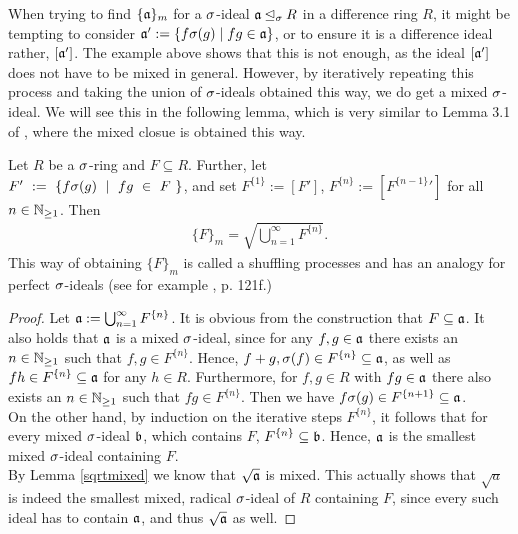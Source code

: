 When trying to find $\{\mathfrak{a}\}_m$ for a $\sigma$-ideal $\mathfrak{a} \unlhd_{\sigma} R$ in a difference ring $R$, it might be tempting to consider $\mathfrak{a}':= \{ f\sigma(g) \mid fg \in \mathfrak{a} \}$, or to ensure it is a difference ideal rather, $[\mathfrak{a}']$. The example above shows that this is not enough,
as the ideal $[\mathfrak{a}']$ does not have to be mixed in general. However, by iteratively repeating this process and taking the union of $\sigma$-ideals obtained this way, we do get a mixed $\sigma$-ideal. We will see this in the following lemma, 
which is very similar to Lemma 3.1 of \cite{levinmixed}, where the mixed closue is obtained this way.
\begin{lem}\label{lemshuffling}
Let $R$ be a $\sigma$-ring and $F \subseteq R$. Further, let \\ $F'~:=~\{f\sigma(g)~\mid~fg~\in~F~\}$, and set $F^{\{1\}}:= [F']$, $F^{\{n\}}:= [{F^{\{n-1\}}}']$ for all $n \in \mathbb{N}_{\geq1}$. Then
\begin{align} \{F\}_m = \sqrt{\bigcup_{n=1}^{\infty} F^{\{n\}}}. \end{align}
This way of obtaining $\{F\}_m$ is called a shuffling processes and has an analogy for perfect $\sigma$-ideals (see for example \cite{levin}, p. 121f.) 
\begin{proof}
Let $\mathfrak{a}:= \bigcup_{n=1}^{\infty} F^{\{n\}}$. It is obvious from the construction that $F \subseteq \mathfrak{a}$. It also holds that $\mathfrak{a}$ is a mixed $\sigma$-ideal, since for any $f,g \in \mathfrak{a}$ there exists an $n \in \mathbb{N}_{\geq1}$ such that $f,g \in F^{\{n\}}$.
Hence, $f + g, \sigma(f) \in F^{\{n\}} \subseteq \mathfrak{a}$, as well as $fh \in F^{\{n\}} \subseteq \mathfrak{a}$ for any $h \in R$. Furthermore, for $f, g \in R$ with $fg \in \mathfrak{a}$ there also exists an $n \in \mathbb{N}_{\geq1}$ such that $fg \in F^{\{n\}}$. 
Then we have $f\sigma(g) \in F^{\{n+1\}} \subseteq \mathfrak{a}$. \\
\indent On the other hand, by induction on the iterative steps $F^{\{n\}}$, it follows that for every mixed $\sigma$-ideal $\mathfrak{b}$, which contains $F$, $F^{\{n\}} \subseteq \mathfrak{b}$. Hence, $\mathfrak{a}$ is the smallest mixed $\sigma$-ideal containing $F$. \\
\indent By Lemma \ref{sqrtmixed} we know that $\sqrt{\mathfrak{a}}$ is mixed. This actually shows that $\sqrt a$ is indeed the smallest mixed, radical $\sigma$-ideal of $R$ containing $F$, since every such ideal has to contain $\mathfrak{a}$, and thus $\sqrt{\mathfrak{a}}$ as well.

\end{proof}
\end{lem}


